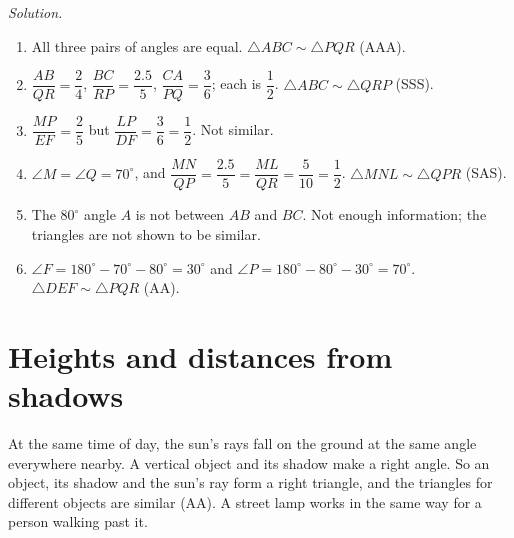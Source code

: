 \documentclass[11pt,a4paper]{article}
\theoremstyle{branddef}
\newcommand{\tr}{\triangle}
\newenvironment{exercise}[1]
  {\par\medskip\Needspace{7\baselineskip}\noindent{\large\bfseries Exercise #1}
   \par\smallskip
   \begin{enumerate}[leftmargin=*,itemsep=4pt]}
  {\end{enumerate}}
\newenvironment{solution}
  {\par\smallskip\begingroup\small\linespread{1.15}\selectfont\color{muted}\noindent\textit{Solution.}\par}
  {\par\endgroup\smallskip}
\newenvironment{steps}{\begin{enumerate}[label=\arabic*.,leftmargin=1.5em,itemsep=0pt,topsep=2pt]}{\end{enumerate}}
\begin{document}
\begin{exercise}{3C}
\begin{center}
\end{center}
\begin{solution}
\begin{steps}
  \item[(i)] All three pairs of angles are equal. $\tr ABC\sim\tr PQR$ (AAA).
  \item[(ii)] $\dfrac{AB}{QR}=\dfrac24$, $\dfrac{BC}{RP}=\dfrac{2.5}{5}$, $\dfrac{CA}{PQ}=\dfrac36$; each is $\dfrac12$. $\tr ABC\sim\tr QRP$ (SSS).
  \item[(iii)] $\dfrac{MP}{EF}=\dfrac25$ but $\dfrac{LP}{DF}=\dfrac36=\dfrac12$. Not similar.
  \item[(iv)] $\angle M=\angle Q=70^\circ$, and $\dfrac{MN}{QP}=\dfrac{2.5}{5}=\dfrac{ML}{QR}=\dfrac{5}{10}=\dfrac12$. $\tr MNL\sim\tr QPR$ (SAS).
  \item[(v)] The $80^\circ$ angle $A$ is not between $AB$ and $BC$. Not enough information; the triangles are not shown to be similar.
  \item[(vi)] $\angle F=180^\circ-70^\circ-80^\circ=30^\circ$ and $\angle P=180^\circ-80^\circ-30^\circ=70^\circ$. $\tr DEF\sim\tr PQR$ (AA).
\end{steps}
\end{solution}
\end{exercise}
\section{Heights and distances from shadows}

At the same time of day, the sun's rays fall on the ground at the same angle everywhere nearby. A vertical object and its shadow make a right angle. So an object, its shadow and the sun's ray form a right triangle, and the triangles for different objects are similar (AA). A street lamp works in the same way for a person walking past it.
\end{document}

